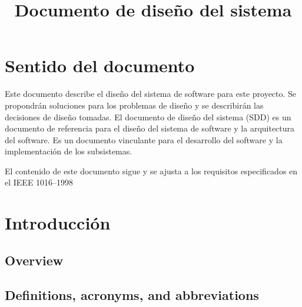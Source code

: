 \documentclass[a4paper,12pt]{article}
\makeatletter
\renewcommand{\maketitle}{\bgroup\setlength{\parindent}{0pt}
    \begin{flushleft}
    {\Huge\textbf{\@title}}
    \end{flushleft}\egroup
}
\makeatother
\begin{document}
    \title{Documento de diseño del sistema\\}
    \maketitle


    \section*{\color{black}Sentido del documento}

    Este documento describe el diseño del sistema de software para este proyecto.
    Se propondrán soluciones para los problemas de diseño y se describirán las decisiones de diseño tomadas.
    El documento de diseño del sistema (SDD) es un documento de referencia para el diseño del sistema de software y la arquitectura del software.
    Es un documento vinculante para el desarrollo del software y la implementación de los subsistemas.

    El contenido de este documento sigue y se ajusta a los requisitos especificados en el IEEE 1016--1998\autocite{IEEE1016-1998}


    \setcounter{tocdepth}{2}
    \tableofcontents


    \section{Introducción}\label{sec:introduccion}

    \subsection{Overview}

    \subsection{Definitions, acronyms, and abbreviations}

    \printbibliography
\end{document}
